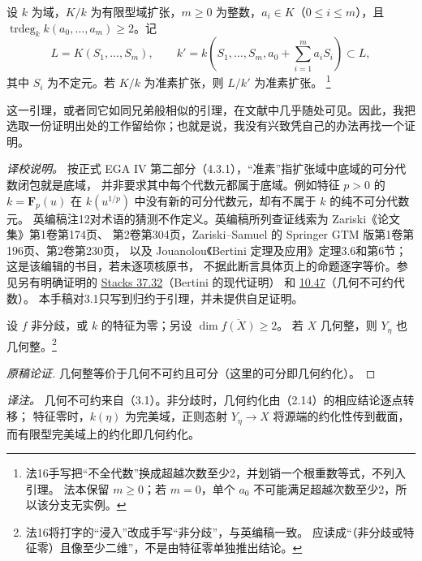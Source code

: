 设 $k$ 为域，$K/k$ 为有限型域扩张，$m\ge0$ 为整数，$a_i\in K$（$0\le i\le m$），且
$\operatorname{trdeg}_k k(a_0,\ldots,a_m)\ge2$。记
\[
 L=K(S_1,\ldots,S_m),\qquad
 k'=k\left(S_1,\ldots,S_m,a_0+\sum_{i=1}^m a_iS_i\right)\subset L,
\]
其中 $S_i$ 为不定元。若 $K/k$ 为准素扩张，则 $L/k'$ 为准素扩张。
\footnote{法16手写把“不全代数”换成超越次数至少2，并划销一个根重数等式，不列入引理。
法本保留 $m\ge0$；若 $m=0$，单个 $a_0$ 不可能满足超越次数至少2，所以该分支无实例。}

这一引理，或者同它如同兄弟般相似的引理，在文献中几乎随处可见。因此，我把选取一份证明出处的工作留给你；也就是说，我没有兴致凭自己的办法再找一个证明。

\noindent\emph{译校说明。}
按正式 EGA IV 第二部分（4.3.1），“准素”指扩张域中底域的可分代数闭包就是底域，
并非要求其中每个代数元都属于底域。例如特征 $p>0$ 的 $k=\mathbf F_p(u)$
在 $k(u^{1/p})$ 中没有新的可分代数元，却有不属于 $k$ 的纯不可分代数元。
英编稿注12对术语的猜测不作定义。英编稿所列查证线索为 Zariski《论文集》第1卷第174页、
第2卷第304页，Zariski--Samuel 的 Springer GTM 版第1卷第196页、第2卷第230页，
以及 Jouanolou《Bertini 定理及应用》定理3.6和第6节；这是该编辑的书目，若未逐项核原书，
不据此断言具体页上的命题逐字等价。参见另有明确证明的
\href{https://stacks.math.columbia.edu/tag/0G4C}{Stacks 37.32}（Bertini 的现代证明）
和 \href{https://stacks.math.columbia.edu/tag/00I2}{10.47}（几何不可约代数）。
本手稿对3.1只写到归约于引理，并未提供自足证明。

设 $f$ 非分歧，或 $k$ 的特征为零；另设 $\dim\overline{f(X)}\ge2$。
若 $X$ 几何整，则 $Y_\eta$ 也几何整。\footnote{法16将打字的“浸入”改成手写“非分歧”，与英编稿一致。
应读成“（非分歧或特征零）且像至少二维”，不是由特征零单独推出结论。}
\begin{proof}[原稿论证]
几何整等价于几何不可约且可分（这里的可分即几何约化）。
\end{proof}
\noindent\emph{译注。}
几何不可约来自（3.1）。非分歧时，几何约化由（2.14）的相应结论逐点转移；
特征零时，$k(\eta)$ 为完美域，正则态射 $Y_\eta\to X$ 将源端的约化性传到截面，
而有限型完美域上的约化即几何约化。

